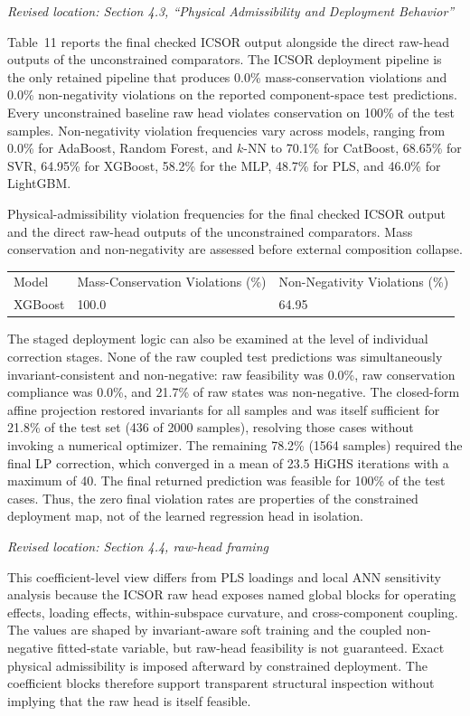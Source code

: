\documentclass[11pt,a4paper]{article}
\newcommand{\excerptlocation}[1]{\par\noindent\textit{Revised location: #1}\par}
\begin{document}
\excerptlocation{Section 4.3, ``Physical Admissibility and Deployment Behavior''}
\begin{revisionexcerpt}
Table~11 reports the final checked ICSOR output alongside the direct raw-head outputs of the unconstrained comparators. The ICSOR deployment pipeline is the only retained pipeline that produces 0.0\% mass-conservation violations and 0.0\% non-negativity violations on the reported component-space test predictions. Every unconstrained baseline raw head violates conservation on 100\% of the test samples. Non-negativity violation frequencies vary across models, ranging from 0.0\% for AdaBoost, Random Forest, and $k$-NN to 70.1\% for CatBoost, 68.65\% for SVR, 64.95\% for XGBoost, 58.2\% for the MLP, 48.7\% for PLS, and 46.0\% for LightGBM.

Physical-admissibility violation frequencies for the final checked ICSOR output and the direct raw-head outputs of the unconstrained comparators. Mass conservation and non-negativity are assessed before external composition collapse.

\begin{center}
\scriptsize
\begin{tabular}{lp{4.0cm}p{4.0cm}}
Model & Mass-Conservation Violations (\%) & Non-Negativity Violations (\%) \\
XGBoost & 100.0 & 64.95 \\
\end{tabular}
\end{center}

The staged deployment logic can also be examined at the level of individual correction stages. None of the raw coupled test predictions was simultaneously invariant-consistent and non-negative: raw feasibility was 0.0\%, raw conservation compliance was 0.0\%, and 21.7\% of raw states was non-negative. The closed-form affine projection restored invariants for all samples and was itself sufficient for 21.8\% of the test set (436 of 2000 samples), resolving those cases without invoking a numerical optimizer. The remaining 78.2\% (1564 samples) required the final LP correction, which converged in a mean of 23.5 HiGHS iterations with a maximum of 40. The final returned prediction was feasible for 100\% of the test cases. Thus, the zero final violation rates are properties of the constrained deployment map, not of the learned regression head in isolation.
\end{revisionexcerpt}

\excerptlocation{Section 4.4, raw-head framing}
\begin{revisionexcerpt}
This coefficient-level view differs from PLS loadings and local ANN sensitivity analysis because the ICSOR raw head exposes named global blocks for operating effects, loading effects, within-subspace curvature, and cross-component coupling. The values are shaped by invariant-aware soft training and the coupled non-negative fitted-state variable, but raw-head feasibility is not guaranteed. Exact physical admissibility is imposed afterward by constrained deployment. The coefficient blocks therefore support transparent structural inspection without implying that the raw head is itself feasible.
\end{revisionexcerpt}
\end{document}
